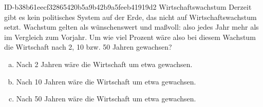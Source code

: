 \begin{exercise}
      {ID-b38b61eecf32865420b5a9b42b9a5feeb41919d2}
      {Wirtschaftswachstum}
  \ifproblem\problem
    Derzeit gibt es kein politisches System auf der Erde, das nicht
    auf Wirtschaftswachstum setzt.  Wachstum gelten als
    wünschenswert und maßvoll: also jedes Jahr  mehr als im
    Vergleich zum Vorjahr. Um wie viel Prozent wäre also bei diesem
    Wachstum die Wirtschaft nach 2, 10 bzw. 50 Jahren gewachsen?
  \fi
  \ifoutcome\outcome
    \begin{enumerate}[a)]
      \item Nach 2  Jahren wäre die Wirtschaft um etwa  gewachsen.
      \item Nach 10 Jahren wäre die Wirtschaft um etwa  gewachsen.
      \item Nach 50 Jahren wäre die Wirtschaft um etwa  gewachsen.
    \end{enumerate}
  \fi
\end{exercise}
